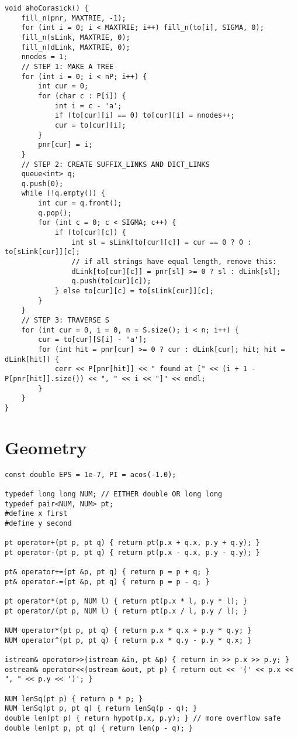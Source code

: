 \documentclass[8pt,a4paper,landscape,oneside]{amsart}
\begin{document}
\begin{multicols*}{3}
\begin{lstlisting}
void ahoCorasick() {
	fill_n(pnr, MAXTRIE, -1);
	for (int i = 0; i < MAXTRIE; i++) fill_n(to[i], SIGMA, 0);
	fill_n(sLink, MAXTRIE, 0);
	fill_n(dLink, MAXTRIE, 0);
	nnodes = 1;
	// STEP 1: MAKE A TREE
	for (int i = 0; i < nP; i++) {
		int cur = 0;
		for (char c : P[i]) {
			int i = c - 'a';
			if (to[cur][i] == 0) to[cur][i] = nnodes++;
			cur = to[cur][i];
		}
		pnr[cur] = i;
	}
	// STEP 2: CREATE SUFFIX_LINKS AND DICT_LINKS
	queue<int> q;
	q.push(0);
	while (!q.empty()) {
		int cur = q.front();
		q.pop();
		for (int c = 0; c < SIGMA; c++) {
			if (to[cur][c]) {
				int sl = sLink[to[cur][c]] = cur == 0 ? 0 : to[sLink[cur]][c];
				// if all strings have equal length, remove this:
				dLink[to[cur][c]] = pnr[sl] >= 0 ? sl : dLink[sl];
				q.push(to[cur][c]);
			} else to[cur][c] = to[sLink[cur]][c];
		}
	}
	// STEP 3: TRAVERSE S
	for (int cur = 0, i = 0, n = S.size(); i < n; i++) {
		cur = to[cur][S[i] - 'a'];
		for (int hit = pnr[cur] >= 0 ? cur : dLink[cur]; hit; hit = dLink[hit]) {
			cerr << P[pnr[hit]] << " found at [" << (i + 1 - P[pnr[hit]].size()) << ", " << i << "]" << endl;
		}
	}
}
\end{lstlisting}

\section{Geometry}

\begin{lstlisting}
const double EPS = 1e-7, PI = acos(-1.0);

typedef long long NUM; // EITHER double OR long long
typedef pair<NUM, NUM> pt;
#define x first
#define y second

pt operator+(pt p, pt q) { return pt(p.x + q.x, p.y + q.y); }
pt operator-(pt p, pt q) { return pt(p.x - q.x, p.y - q.y); }

pt& operator+=(pt &p, pt q) { return p = p + q; }
pt& operator-=(pt &p, pt q) { return p = p - q; }

pt operator*(pt p, NUM l) { return pt(p.x * l, p.y * l); }
pt operator/(pt p, NUM l) { return pt(p.x / l, p.y / l); }

NUM operator*(pt p, pt q) { return p.x * q.x + p.y * q.y; }
NUM operator^(pt p, pt q) { return p.x * q.y - p.y * q.x; }

istream& operator>>(istream &in, pt &p) { return in >> p.x >> p.y; }
ostream& operator<<(ostream &out, pt p) { return out << '(' << p.x << ", " << p.y << ')'; }

NUM lenSq(pt p) { return p * p; }
NUM lenSq(pt p, pt q) { return lenSq(p - q); }
double len(pt p) { return hypot(p.x, p.y); } // more overflow safe
double len(pt p, pt q) { return len(p - q); }


\end{lstlisting}
\end{multicols*}
\end{document}
